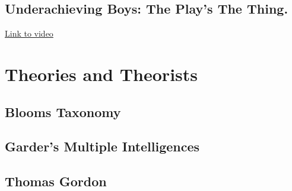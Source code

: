 \documentclass[12pt]{report}
\begin{document}
\section{Underachieving Boys: The Play's The Thing.}

\href{https://www.youtube.com/watch?v=9196qkVWaLw}{Link to video}













\chapter{Theories and Theorists}
\label{chap:theories}


\section{Blooms Taxonomy}
\label{sec:blooms_taxonomy}




\section{Garder's Multiple Intelligences}
\label{sec:gardner_theory}



\section{Thomas Gordon}
\label{sec:gordon_theory}
\end{document}
